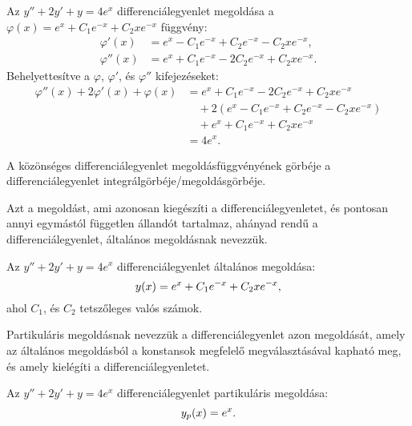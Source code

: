 \begin{example}[][nobreak]
  Az $y'' + 2y' + y = 4e^x$ differenciálegyenlet megoldása a
  $\varphi(x) = e^x + C_1 e^{-x} + C_2 x e^{-x}$ függvény:
  \begin{align*}
    \varphi'(x)  & = e^x - C_1 e^{-x} + C_2 e^{-x} - C_2 x e^{-x},  \\
    \varphi''(x) & = e^x + C_1 e^{-x} - 2C_2 e^{-x} + C_2 x e^{-x}.
  \end{align*}
  Behelyettesítve a $\varphi$, $\varphi'$, és $\varphi''$ kifejezéseket:
  \begin{align*}
    \varphi''(x) + 2\varphi'(x) + \varphi(x)
     & = e^x + C_1 e^{-x} - 2C_2 e^{-x} + C_2 x e^{-x}
    \\
     & \quad + 2 \left( e^x - C_1 e^{-x} + C_2 e^{-x} - C_2 x e^{-x} \right)
    \\
     & \quad + e^x + C_1 e^{-x} + C_2 x e^{-x}
    \\
     & = 4e^x.
  \end{align*}
\end{example}

\begin{definition}[Megoldásgörbe]
  A közönséges differenciálegyenlet megoldásfüggvényének görbéje a
  differenciálegyenlet integrálgörbéje/megoldásgörbéje.
\end{definition}

\begin{definition}
  Azt a megoldást, ami azonosan kiegészíti a differenciálegyenletet, és pontosan
  annyi egymástól független állandót tartalmaz, ahányad rendű a
  differenciálegyenlet, általános megoldásnak nevezzük.
\end{definition}

\begin{example}
  Az $y'' + 2y' + y = 4e^x$ differenciálegyenlet általános megoldása:
  $$
    y(x) = e^x + C_1 e^{-x} + C_2 x e^{-x}
    \text,
  $$
  ahol $C_1$, és $C_2$ tetszőleges valós számok.
\end{example}

\begin{definition}
  Partikuláris megoldásnak nevezzük a differenciálegyenlet azon
  megoldását, amely az általános megoldásból a konstansok megfelelő
  megválasztásával kapható meg, és amely kielégíti a differenciálegyenletet.
\end{definition}

\begin{example}
  Az $y'' + 2y' + y = 4e^x$ differenciálegyenlet partikuláris megoldása:
  $$
    y_p(x) = e^x
    \text.
  $$
\end{example}

